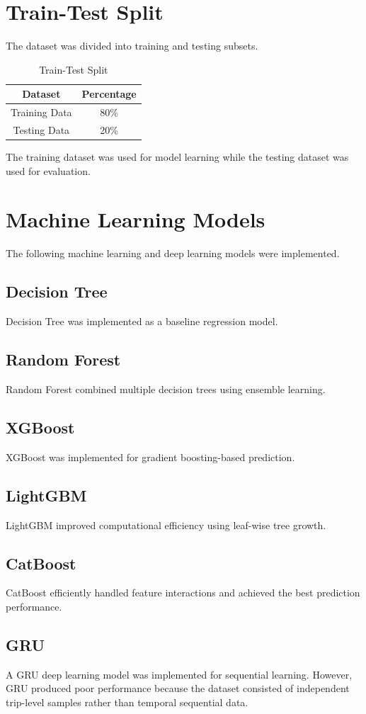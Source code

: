 \documentclass[12pt,a4paper]{report}
\begin{document}
\section{Train-Test Split}
The dataset was divided into training and testing subsets.
\begin{table}[H]
\centering
\begin{tabular}{|c|c|}
\hline
\textbf{Dataset} & \textbf{Percentage} \\
\hline
Training Data & 80\% \\
Testing Data & 20\% \\
\hline
\end{tabular}
\caption{Train-Test Split}
\end{table}
The training dataset was used for model learning while the testing dataset was used for evaluation.

\section{Machine Learning Models}
The following machine learning and deep learning models were implemented.
\subsection{Decision Tree}
Decision Tree was implemented as a baseline regression model.
\subsection{Random Forest}
Random Forest combined multiple decision trees using ensemble learning.
\subsection{XGBoost}
XGBoost was implemented for gradient boosting-based prediction.
\subsection{LightGBM}
LightGBM improved computational efficiency using leaf-wise tree growth.
\subsection{CatBoost}
CatBoost efficiently handled feature interactions and achieved the best prediction performance.
\subsection{GRU}
A GRU deep learning model was implemented for sequential learning.
However, GRU produced poor performance because the dataset consisted of independent trip-level samples rather than temporal sequential data.
\end{document}
